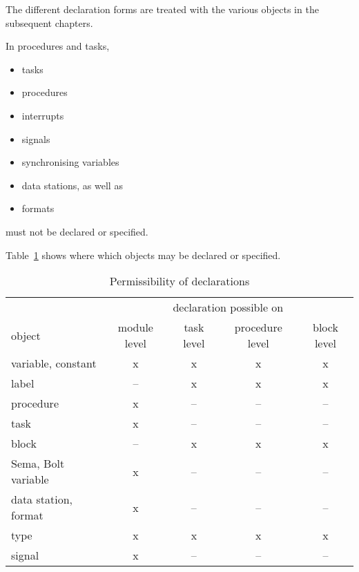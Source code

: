 The different declaration forms are treated with the various objects in
the subsequent chapters.

In procedures and tasks,
\begin{itemize}
\item tasks
\item procedures
\item interrupts
\item signals
\item synchronising variables
\item data stations, as well as
\item formats
\end{itemize}
must not be declared or specified.

Table~\ref{objekte} shows where which objects may be declared or
specified.

\begin{table}
\caption{Permissibility of declarations\label{objekte}}
\vspace{5mm}

\begin{tabular}{|l|c|c|c|c|}
\hline
                       & \multicolumn{4}{|c|}{declaration possible on} \\
object                 & module level & task level & procedure level & block level \\ \hline
variable, constant     & x            & x    & x         & x  \\
label                  & --           & x    & x         & x  \\
procedure              & x            & --    & --         & -- \\
task                   & x            & --   & --        & -- \\
block                  & --           & x    & x         & x  \\
Sema, Bolt variable    & x            & --   & --        & -- \\
data station, format   & x            & --   & --        & -- \\
type                   & x            & x    & x         & x \\
signal                 & x            & --   & --        & -- \\ 
\hline
\end{tabular}
\end{table}

